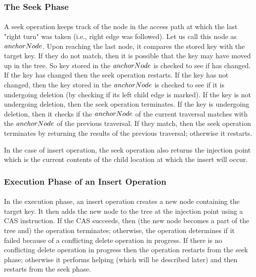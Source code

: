 \subsubsection{The Seek Phase} \paragraph{}
A seek operation keeps track of the node in the access path at which the last "right turn" was taken (i.e., right edge was followed). Let us call this node as $anchorNode$. Upon reaching the last node, it compares the stored key with the target key. If they do not match, then it is possible that the key may have moved up in the tree. So key stored in the $anchorNode$ is checked to see if has changed. If the key has changed then the seek operation restarts. If the key has not changed, then the key stored in the $anchorNode$ is checked to see if it is undergoing deletion (by checking if its left child edge is marked). If the key is not undergoing deletion, then the seek operation terminates. If the key is undergoing deletion, then it checks if the $anchorNode$ of the current traversal matches with the $anchorNode$ of the previous traversal. If they match, then the seek operation terminates by returning the results of the previous traversal; otherwise it restarts.\par
In the case of insert operation, the seek operation also returns the injection point which is the current contents of the child location at which the insert will occur.

\subsubsection{Execution Phase of an Insert Operation} \paragraph{}
In the execution phase, an insert operation creates a new node containing the target key. It then adds the new node to the tree at the injection point using a CAS instruction. If the CAS succeeds, then (the new node becomes a part of the tree and) the operation terminates; otherwise, the operation determines if it failed because of a conflicting delete operation in progress. If there is no conflicting delete operation in progress then the operation restarts from the seek phase; otherwise it performs helping (which will be described later) and then restarts from the seek phase.

